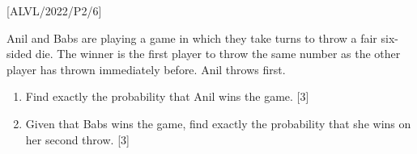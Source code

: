 \item {[}ALVL/2022/P2/6{]}

Anil and Babs are playing a game in which they take turns to throw
a fair six-sided die. The winner is the first player to throw the
same number as the other player has thrown immediately before. Anil
throws first. 
\begin{enumerate}
\item Find exactly the probability that Anil wins the game. \hfill{}{[}3{]}
\item Given that Babs wins the game, find exactly the probability that she
wins on her second throw.\hfill{} {[}3{]}
\end{enumerate}
